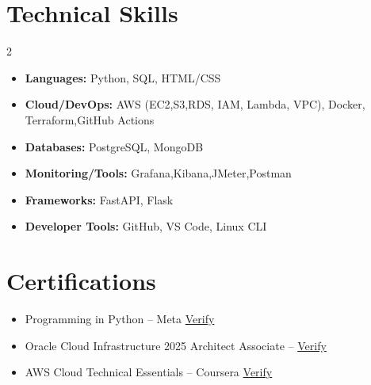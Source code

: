 \documentclass[a4paper,9pt]{article}
\begin{document}
\section*{Technical Skills}
\begin{multicols}{2}
\begin{itemize}[leftmargin=1em]
    \item \textbf{Languages:} Python, SQL, HTML/CSS
    \item \textbf{Cloud/DevOps:} AWS (EC2,S3,RDS, IAM, Lambda, VPC), Docker, Terraform,GitHub Actions
    \item \textbf{Databases:} PostgreSQL, MongoDB
    \item \textbf{Monitoring/Tools:} Grafana,Kibana,JMeter,Postman
    \item \textbf{Frameworks:} FastAPI, Flask
    \item \textbf{Developer Tools:} GitHub, VS Code, Linux CLI
\end{itemize}
\end{multicols}

\section*{Certifications}
\begin{itemize}[leftmargin=1em]
    \item Programming in Python – Meta \href{https://www.coursera.org/share/701f13eec074a4a8035227c2a7066aca}{Verify}
    \item Oracle Cloud Infrastructure 2025 Architect Associate – \href{https://catalog-education.oracle.com/ords/certview/sharebadge?id=E45A3CC3373EBEAA70FCD587FF0DE60058FDD8AF09D282D26223DCC76052C3CC}{Verify}
    \item AWS Cloud Technical Essentials – Coursera \href{https://www.coursera.org/share/12fc3ba6212bcc89b4236659a25c9a4b}{Verify}
\end{itemize}
\end{document}
